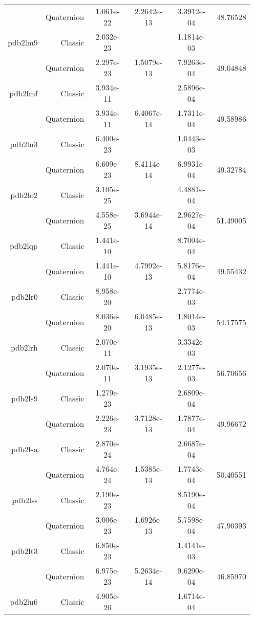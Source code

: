 \begin{xltabular}{\textwidth}{r|rS[table-format=1.3e+2]S[table-format=1.4e+2]S[table-format=1.4e+2]S[table-format=-1.5]}
& Quaternion & 1.061e-22 & 2.2642e-13 & 3.3912e-04 & 48.76528\\  \addlinespace
pdb2lm9 & Classic & 2.032e-23 &  & 1.1814e-03 & \\
& Quaternion & 2.297e-23 & 1.5079e-13 & 7.9263e-04 & 49.04848\\  \addlinespace
pdb2lmf & Classic & 3.934e-11 &  & 2.5896e-04 & \\
& Quaternion & 3.934e-11 & 6.4067e-14 & 1.7311e-04 & 49.58986\\  \addlinespace
pdb2ln3 & Classic & 6.400e-23 &  & 1.0443e-03 & \\
& Quaternion & 6.609e-23 & 8.4114e-14 & 6.9931e-04 & 49.32784\\  \addlinespace
pdb2lo2 & Classic & 3.105e-25 &  & 4.4881e-04 & \\
& Quaternion & 4.558e-25 & 3.6944e-14 & 2.9627e-04 & 51.49005\\  \addlinespace
pdb2lqp & Classic & 1.441e-10 &  & 8.7004e-04 & \\
& Quaternion & 1.441e-10 & 4.7992e-13 & 5.8176e-04 & 49.55432\\  \addlinespace
pdb2lr0 & Classic & 8.958e-20 &  & 2.7774e-03 & \\
& Quaternion & 8.036e-20 & 6.0485e-13 & 1.8014e-03 & 54.17575\\  \addlinespace
pdb2lrh & Classic & 2.070e-11 &  & 3.3342e-03 & \\
& Quaternion & 2.070e-11 & 3.1935e-13 & 2.1277e-03 & 56.70656\\  \addlinespace
pdb2ls9 & Classic & 1.279e-23 &  & 2.6809e-04 & \\
& Quaternion & 2.226e-23 & 3.7128e-13 & 1.7877e-04 & 49.96672\\  \addlinespace
pdb2lsa & Classic & 2.870e-24 &  & 2.6687e-04 & \\
& Quaternion & 4.764e-24 & 1.5385e-13 & 1.7743e-04 & 50.40551\\  \addlinespace
pdb2lss & Classic & 2.190e-23 &  & 8.5190e-04 & \\
& Quaternion & 3.006e-23 & 1.6926e-13 & 5.7598e-04 & 47.90393\\  \addlinespace
pdb2lt3 & Classic & 6.850e-23 &  & 1.4141e-03 & \\
& Quaternion & 6.975e-23 & 5.2634e-14 & 9.6290e-04 & 46.85970\\  \addlinespace
pdb2lu6 & Classic & 4.905e-26 &  & 1.6714e-04 & \\

\end{xltabular}
